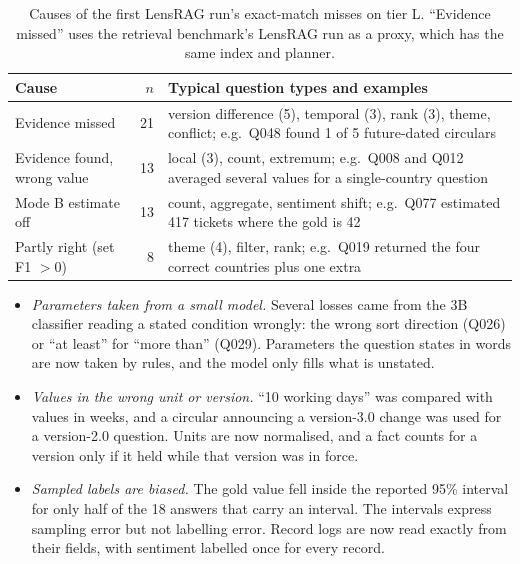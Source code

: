 \documentclass[11pt,letterpaper,oneside]{report}
\begin{document}
\begin{table}[htbp]
\centering\small
\caption{Causes of the first LensRAG run's exact-match misses on tier L.
``Evidence missed'' uses the retrieval benchmark's LensRAG run as a proxy,
which has the same index and planner.}
\label{tab:errors}
\begin{tabularx}{\textwidth}{@{}lrX@{}}
\toprule
Cause & $n$ & Typical question types and examples \\
\midrule
Evidence missed & 21 & version difference (5), temporal (3), rank (3), theme, conflict; e.g.\ Q048 found 1 of 5 future-dated circulars \\
Evidence found, wrong value & 13 & local (3), count, extremum; e.g.\ Q008 and Q012 averaged several values for a single-country question \\
Mode B estimate off & 13 & count, aggregate, sentiment shift; e.g.\ Q077 estimated 417 tickets where the gold is 42 \\
Partly right (set F1 $>0$) & 8 & theme (4), filter, rank; e.g.\ Q019 returned the four correct countries plus one extra \\
\bottomrule
\end{tabularx}
\end{table}

\begin{itemize}
  \item \emph{Parameters taken from a small model.} Several losses came from
  the 3B classifier reading a stated condition wrongly: the wrong sort
  direction (Q026) or ``at least'' for ``more than'' (Q029). Parameters the
  question states in words are now taken by rules, and the model only fills
  what is unstated.
  \item \emph{Values in the wrong unit or version.} ``10 working days'' was
  compared with values in weeks, and a circular announcing a version-3.0
  change was used for a version-2.0 question. Units are now normalised, and
  a fact counts for a version only if it held while that version was in
  force.
  \item \emph{Sampled labels are biased.} The gold value fell inside the
  reported 95\% interval for only half of the 18 answers that carry an
  interval. The intervals express sampling error but not labelling error.
  Record logs are now read exactly from their fields, with sentiment
  labelled once for every record.
\end{itemize}
\end{document}
